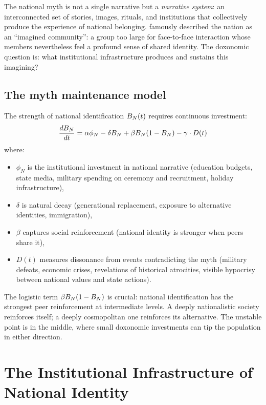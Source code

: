The national myth is not a single narrative but a \emph{narrative system}: an interconnected set of stories, images, rituals, and institutions that collectively produce the experience of national belonging.
\textcite{anderson2006} famously described the nation as an ``imagined community'': a group too large for face-to-face interaction whose members nevertheless feel a profound sense of shared identity.
The doxonomic question is: what institutional infrastructure produces and sustains this imagining?

\subsection{The myth maintenance model}

\begin{model}
\label{mod:myth-maintenance}
The strength of national identification $B_{N}(t)$ requires continuous investment:
\[
  \frac{dB_{N}}{dt} = \alpha \phi_N - \delta B_{N} + \beta B_{N}(1 - B_{N}) - \gamma \cdot D(t)
\]
where:
\begin{itemize}[nosep]
  \item $\phi_N$ is the institutional investment in national narrative (education budgets, state media, military spending on ceremony and recruitment, holiday infrastructure),
  \item $\delta$ is natural decay (generational replacement, exposure to alternative identities, immigration),
  \item $\beta$ captures social reinforcement (national identity is stronger when peers share it),
  \item $D(t)$ measures dissonance from events contradicting the myth (military defeats, economic crises, revelations of historical atrocities, visible hypocrisy between national values and state actions).
\end{itemize}
\end{model}

The logistic term $\beta B_{N}(1 - B_{N})$ is crucial: national identification has the strongest peer reinforcement at intermediate levels.
A deeply nationalistic society reinforces itself; a deeply cosmopolitan one reinforces its alternative.
The unstable point is in the middle, where small doxonomic investments can tip the population in either direction.

\section{The Institutional Infrastructure of National Identity}
\label{sec:ch27-infrastructure}

